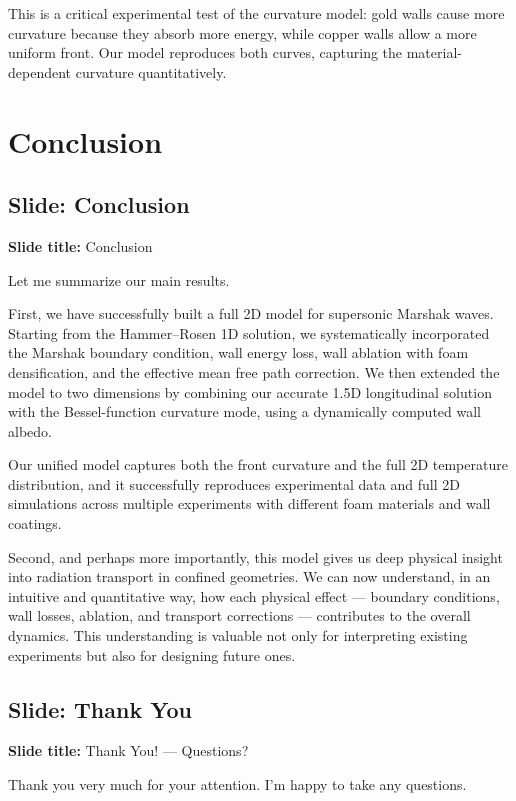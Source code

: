 \documentclass[12pt, a4paper]{article}
\begin{document}
This is a critical experimental test of the curvature model: gold walls cause more curvature because they absorb more energy, while copper walls allow a more uniform front. Our model reproduces both curves, capturing the material-dependent curvature quantitatively.

\section{Conclusion}

\subsection{Slide: Conclusion}

\begin{slidebox}
\textbf{Slide title:} Conclusion
\end{slidebox}

Let me summarize our main results.

First, we have successfully built a full 2D model for supersonic Marshak waves. Starting from the Hammer--Rosen 1D solution, we systematically incorporated the Marshak boundary condition, wall energy loss, wall ablation with foam densification, and the effective mean free path correction. We then extended the model to two dimensions by combining our accurate 1.5D longitudinal solution with the Bessel-function curvature mode, using a dynamically computed wall albedo.

Our unified model captures both the front curvature and the full 2D temperature distribution, and it successfully reproduces experimental data and full 2D simulations across multiple experiments with different foam materials and wall coatings.

Second, and perhaps more importantly, this model gives us deep physical insight into radiation transport in confined geometries. We can now understand, in an intuitive and quantitative way, how each physical effect --- boundary conditions, wall losses, ablation, and transport corrections --- contributes to the overall dynamics. This understanding is valuable not only for interpreting existing experiments but also for designing future ones.

\subsection{Slide: Thank You}

\begin{slidebox}
\textbf{Slide title:} Thank You! --- Questions?
\end{slidebox}

Thank you very much for your attention. I'm happy to take any questions.
\end{document}
